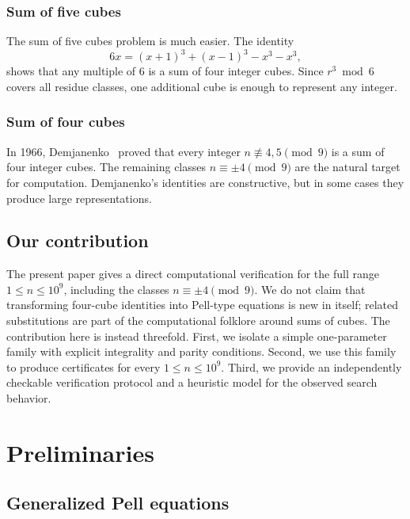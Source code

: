 \documentclass{mcom-l}
\theoremstyle{definition}
\theoremstyle{remark}
\numberwithin{equation}{section}
\begin{document}
\subsubsection{Sum of five cubes}
The sum of five cubes problem is much easier.  The identity
\cite{HardyWright2008}
\begin{equation}
6x = (x+1)^3 + (x-1)^3 - x^3 - x^3,
\end{equation}
shows that any multiple of $6$ is a sum of four integer cubes.  Since
$r^3\bmod 6$ covers all residue classes, one additional cube is enough to
represent any integer.

\subsubsection{Sum of four cubes}

In 1966, Demjanenko~\cite{Demjanenko1966} proved that every integer
$n\not\equiv 4,5\pmod 9$ is a sum of four integer cubes.  The remaining
classes $n\equiv \pm 4\pmod 9$ are the natural target for computation.
Demjanenko's identities are constructive, but in some cases they produce
large representations.

\subsection{Our contribution}
\label{subsec:our_contribution}

The present paper gives a direct computational verification for the full
range $1\leq n\leq 10^9$, including the classes $n\equiv\pm4\pmod 9$.
We do not claim that transforming four-cube identities into Pell-type
equations is new in itself; related substitutions are part of the
computational folklore around sums of cubes.  The contribution here is
instead threefold.  First, we isolate a simple one-parameter family with
explicit integrality and parity conditions.  Second, we use this family to
produce certificates for every $1\leq n\leq 10^9$.  Third, we provide an
independently checkable verification protocol and a heuristic model for the
observed search behavior.

\section{Preliminaries}
\label{sec:preliminaries}

\subsection{Generalized Pell equations}
\label{subsec:pell_equation}
\end{document}

